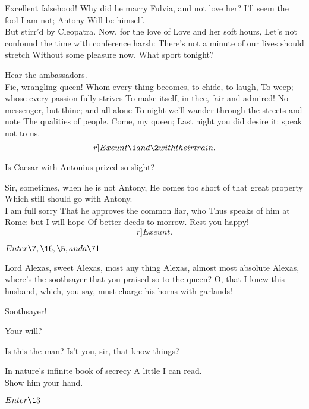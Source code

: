\documentclass{book}
\begin{document}
\2	Excellent falsehood!
	Why did he marry Fulvia, and not love her?
	I'll seem the fool I am not; Antony 
	Will be himself. \\

\1	                  But stirr'd by Cleopatra.
	Now, for the love of Love and her soft hours, 
        Let's not confound the time with conference harsh: 
	There's not a minute of our lives should stretch 
	Without some pleasure now. What sport tonight?

\2	Hear the ambassadors. \\

\1	Fie, wrangling queen!
	Whom every thing becomes, to chide, to laugh,
	To weep; whose every passion fully strives
	To make itself, in thee, fair and admired!
	No messenger, but thine; and all alone
	To-night we'll wander through the streets and note
	The qualities of people. Come, my queen;
	Last night you did desire it: speak not to us.
	\[r]Exeunt \1 and \2 with their train.\]

\9	Is Caesar with Antonius prized so slight?

	Sir, sometimes, when he is not Antony,
	He comes too short of that great property
	Which still should go with Antony. \\

\9	I am full sorry
	That he approves the common liar, who
	Thus speaks of him at Rome: but I will hope
	Of better deeds to-morrow. Rest you happy! \[r]Exeunt.\]


\(Enter \7, \16, \5, and a \71\)

\begin{PROSE}

\7	Lord Alexas, sweet Alexas, most any thing Alexas,
	almost most absolute Alexas, where's the soothsayer
	that you praised so to the queen? O, that I knew
	this husband, which, you say, must charge his horns
	with garlands! 

\5	Soothsayer! 

	Your will?

\7	Is this the man? Is't you, sir, that know things?

\end{PROSE}

	In nature's infinite book of secrecy
	A little I can read.\\

\5	Show him your hand.

	\(Enter \13\)
\end{document}
